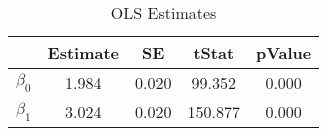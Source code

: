 \begin{table}[htb]
\centering
\caption{OLS Estimates}
\label{table:ea3:ps1:q3a:tab1}
\begin{tabular}{lcccc}
\hline
 & Estimate & SE & tStat & pValue \\
\hline\hline
$\beta_0$ & 1.984 & 0.020 & 99.352 & 0.000 \\
$\beta_1$ & 3.024 & 0.020 & 150.877 & 0.000 \\
\hline
\end{tabular}
\end{table}

